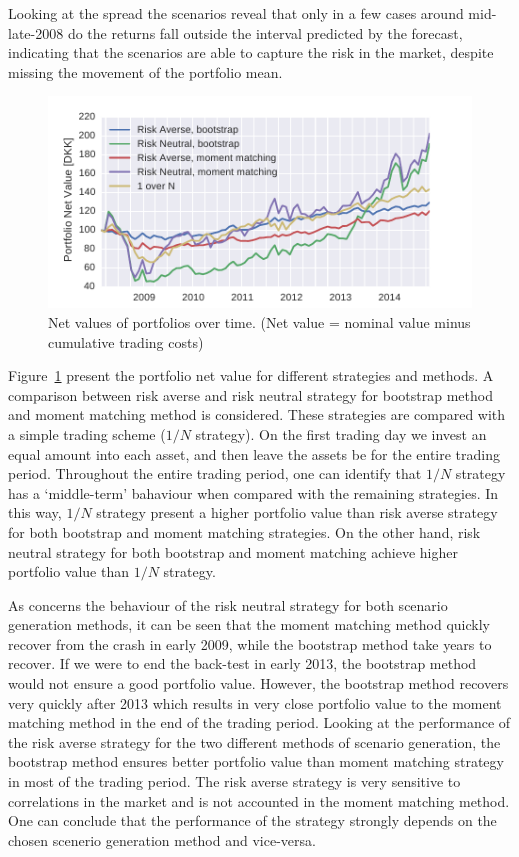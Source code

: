 Looking at the spread the scenarios reveal that only in a few cases around mid-late-2008 do the returns fall outside the interval predicted by the forecast, indicating that the scenarios are able to capture the risk in the market, despite missing the movement of the portfolio mean.

\begin{figure}[tpb]
\centering
\includegraphics{../pic/trading_portfolio_value.pdf}
\caption{Net values of portfolios over time. (Net value = nominal value minus cumulative trading costs)}
\label{fig:tradingportfoliovalues}
\end{figure}

Figure~\ref{fig:tradingportfoliovalues} present the portfolio net value for different strategies and methods. 
A comparison between risk averse and risk neutral strategy for bootstrap method and moment matching method is considered.
These strategies are compared with a simple trading scheme ($1/N$ strategy).
On the first trading day we invest an equal amount into each asset, and then leave the assets be for the entire trading period.
Throughout the entire trading period, one can identify that $1/N$ strategy has a `middle-term' bahaviour when compared with the remaining strategies.
In this way, $1/N$ strategy present a higher portfolio value than risk averse strategy for both bootstrap and moment matching strategies.
On the other hand, risk neutral strategy for both bootstrap and moment matching achieve higher portfolio value than $1/N$ strategy.

As concerns the behaviour of the risk neutral strategy for both scenario generation methods, it can be seen that the moment matching method quickly recover from the crash in early 2009, while the bootstrap method take years to recover.
If we were to end the back-test in early 2013, the bootstrap method would not ensure a good portfolio value.
However, the bootstrap method recovers very quickly after 2013 which results in very close portfolio value to the moment matching method in the end of the trading period.
Looking at the performance of the risk averse strategy for the two different methods of scenario generation, the bootstrap method ensures better portfolio value than moment matching strategy in most of the trading period. The risk averse strategy is very sensitive to correlations in the market and is not accounted in the moment matching method. 
One can conclude that the performance of the strategy strongly depends on the chosen scenerio generation method and vice-versa.

